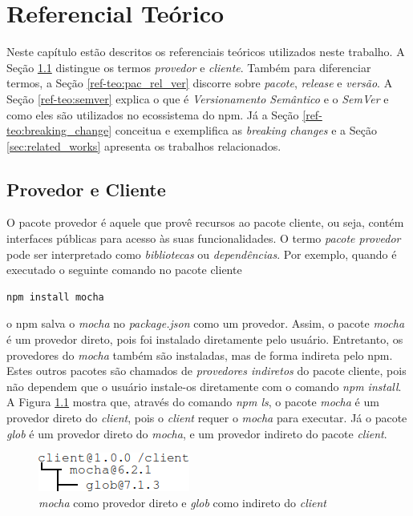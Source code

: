 \chapter{Referencial Teórico}
\label{cap:ref-teorico}
Neste capítulo estão descritos os referenciais teóricos utilizados neste trabalho. A Seção \ref{ref-teo:prov_clie} distingue os termos \textit{provedor} e \textit{cliente}. Também para diferenciar termos, a Seção \ref{ref-teo:pac_rel_ver} discorre sobre \textit{pacote}, \textit{release} e \textit{versão}. A Seção \ref{ref-teo:semver} explica o que é \textit{Versionamento Semântico} e o \textit{SemVer} e como eles são utilizados no ecossistema do \gls{npm}. Já a Seção \ref{ref-teo:breaking_change} conceitua e exemplifica as \textit{breaking changes} e a Seção \ref{sec:related_works} apresenta os trabalhos relacionados.

\section{Provedor e Cliente}
\label{ref-teo:prov_clie}
O pacote provedor é aquele que provê recursos ao pacote cliente, ou seja, contém interfaces públicas para acesso às suas funcionalidades. O termo \textit{pacote provedor} pode ser interpretado como \textit{bibliotecas} ou \textit{dependências}. Por exemplo, quando é executado o seguinte comando no pacote cliente

\begin{lstlisting}[style=bash, label=cod:install:provider]
npm install mocha
\end{lstlisting}
o \gls{npm} salva o \textit{mocha} no \textit{package.json} como um provedor. Assim, o pacote \textit{mocha} é um provedor direto, pois foi instalado diretamente pelo usuário. Entretanto, os provedores do \textit{mocha} também são instaladas, mas de forma indireta pelo \gls{npm}. Estes outros pacotes são chamados de \textit{provedores indiretos} do pacote cliente, pois não dependem que o usuário instale-os diretamente com o comando \textit{npm install}. A Figura \ref{fig:provider} mostra que, através do comando \textit{npm ls}, o pacote \textit{mocha} é um provedor direto do \textit{client}, pois o \textit{client} requer o \textit{mocha} para executar. Já o pacote \textit{glob} é um provedor direto do \textit{mocha}, e um provedor indireto do pacote \textit{client}.

\begin{figure}
    \centering
    \includegraphics{figuras/provider_directly_undirectly.png}
    \caption{\textit{mocha} como provedor direto e \textit{glob} como indireto do \textit{client}}
    \label{fig:provider}
\end{figure}{}

